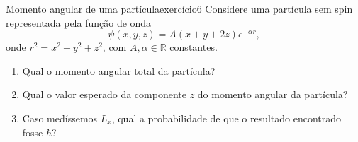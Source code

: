 \begin{exercício}{Momento angular de uma partícula}{exercício6}
    Considere uma partícula sem spin representada pela função de onda
    \begin{equation*}
        \psi(x,y,z) = A(x + y + 2z) e^{-\alpha r},
    \end{equation*}
    onde \(r^2 = x^2 + y^2 + z^2\), com \(A, \alpha \in \mathbb{R}\) constantes.
    \begin{enumerate}[label=(\alph*)]
        \item Qual o momento angular total da partícula?
        \item Qual o valor esperado da componente \(z\) do momento angular da partícula?
        \item Caso medíssemos \(L_x\), qual a probabilidade de que o resultado encontrado fosse \(\hbar\)?
    \end{enumerate}
\end{exercício}
